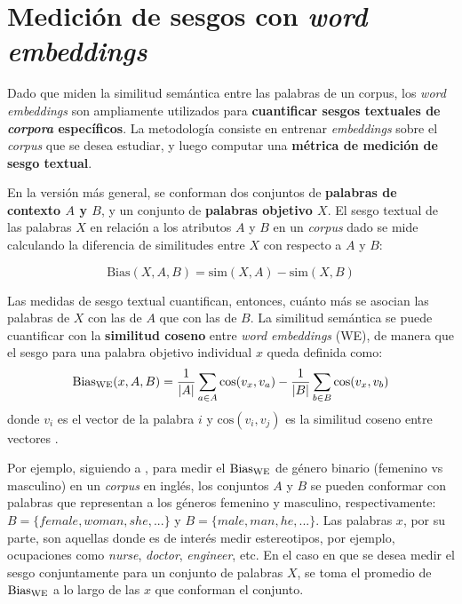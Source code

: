 \section{Medición de sesgos con \emph{word embeddings}} \label{sec:bias_we}

Dado que miden la similitud semántica entre las palabras de un corpus, los \emph{word embeddings} son ampliamente utilizados para \textbf{cuantificar sesgos textuales de \emph{corpora} específicos}. La metodología consiste en entrenar \emph{embeddings} sobre el \emph{corpus} que se desea estudiar, y luego computar una \textbf{métrica de medición de sesgo textual}.

En la versión más general, se conforman dos conjuntos de \textbf{palabras de contexto $A$ y $B$}, y un conjunto de \textbf{palabras objetivo $X$}. El sesgo textual de las palabras $X$ en relación a los atributos $A$ y $B$ en un \emph{corpus} dado se mide calculando la diferencia de similitudes entre $X$ con respecto a $A$ y $B$:

\begin{equation} \label{eq:bias}
    \text{Bias}(X,A,B) = \text{sim}(X,A) - \text{sim}(X,B)
\end{equation}

Las medidas de sesgo textual cuantifican, entonces, cuánto más se asocian las palabras de $X$ con las de $A$ que con las de $B$. La similitud semántica se puede cuantificar con la \textbf{similitud coseno} entre \emph{word embeddings} (WE), de manera que el sesgo para una palabra objetivo individual $x$ queda definida como:
%
\begin{equation} \label{eq:bias_we}
    \operatorname{Bias_{WE}}(x,A,B) =
    \frac{1}{|A|} \sum_{a \in A} \text{cos}(v_x,v_a) -
    \frac{1}{|B|} \sum_{b \in B} \text{cos}(v_x,v_b)
\end{equation}
%
donde $v_i$ es el vector de la palabra $i$ y $\text{cos}(v_i,v_j)$ es la similitud coseno entre vectores \citep{lewis2020gender}.

Por ejemplo, siguiendo a \citet{lewis2020gender}, para medir el $\operatorname{Bias_{WE}}$ de género binario (femenino vs masculino) en un \emph{corpus} en inglés, los conjuntos $A$ y $B$ se pueden conformar con palabras que representan a los géneros femenino y masculino, respectivamente: $B = \{female,woman,she,...\}$ y $B = \{male,man,he,...\}$. Las palabras $x$, por su parte, son aquellas donde es de interés medir estereotipos, por ejemplo, ocupaciones como \emph{nurse}, \emph{doctor}, \emph{engineer}, etc. En el caso en que se desea medir el sesgo conjuntamente para un conjunto de palabras $X$, se toma el promedio de $\operatorname{Bias_{WE}}$ a lo largo de las $x$ que conforman el conjunto. 

